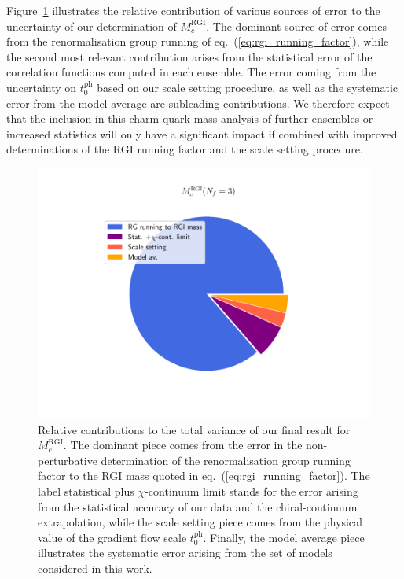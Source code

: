 Figure~\ref{fig:mc_error_contributions} illustrates the relative contribution of various sources of error to the
uncertainty of our determination of $M_c^{\mathrm{RGI}}$. The dominant source of error comes from the 
renormalisation group running of eq.~(\ref{eq:rgi_running_factor}), while the second most relevant 
contribution arises from the statistical error of  the correlation functions computed in each ensemble.  
The  error coming from  the uncertainty on $t_0^{\mathrm{ph}}$ based on our  scale setting  procedure, as well as the 
systematic error from the model average  are subleading contributions. We therefore expect
that the 
inclusion in this charm quark mass analysis of further ensembles or increased statistics will only have a significant impact if combined with improved determinations of the RGI running factor and the scale setting procedure.
%
\begin{figure}
	\centering
	\includegraphics[scale=0.5]{./cap6/figs/mc/mc_error_pie.pdf}
	\caption{Relative contributions to the total variance of our final result for $M_c^{\mathrm{RGI}}$. The dominant piece comes from the error in the non-perturbative determination of the renormalisation group running factor to the RGI mass quoted in eq.~(\ref{eq:rgi_running_factor}). The label statistical plus $\chi$-continuum limit stands for the error arising from the statistical accuracy of our data and the chiral-continuum extrapolation, while the scale setting piece comes from the physical value of the gradient flow scale $t_0^{\mathrm{ph}}$. Finally, the model average piece illustrates the systematic error arising from the set of models considered in this work.
          }
	\label{fig:mc_error_contributions}
\end{figure}
%


